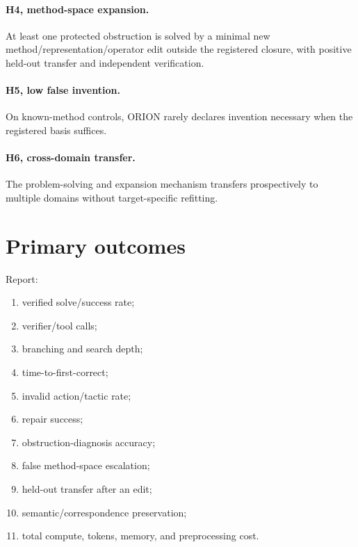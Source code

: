 \documentclass[11pt]{article}
\begin{document}
\paragraph{H4, method-space expansion.}
At least one protected obstruction is solved by a minimal new method/representation/operator edit outside the registered closure, with positive held-out transfer and independent verification.

\paragraph{H5, low false invention.}
On known-method controls, ORION rarely declares invention necessary when the registered basis suffices.

\paragraph{H6, cross-domain transfer.}
The problem-solving and expansion mechanism transfers prospectively to multiple domains without target-specific refitting.

\section{Primary outcomes}
Report:
\begin{enumerate}
    \item verified solve/success rate;
    \item verifier/tool calls;
    \item branching and search depth;
    \item time-to-first-correct;
    \item invalid action/tactic rate;
    \item repair success;
    \item obstruction-diagnosis accuracy;
    \item false method-space escalation;
    \item held-out transfer after an edit;
    \item semantic/correspondence preservation;
    \item total compute, tokens, memory, and preprocessing cost.
\end{enumerate}
\end{document}
